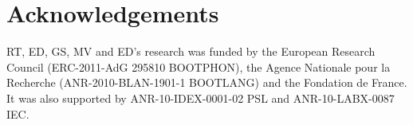 \documentclass[a4paper]{article}
\begin{document}
%



 \section{Acknowledgements}
RT, ED, GS, MV and ED's research was funded by the European Research Council (ERC-2011-AdG 295810 BOOTPHON), the Agence Nationale pour la Recherche (ANR-2010-BLAN-1901-1 BOOTLANG) and the Fondation de France. It was also supported by ANR-10-IDEX-0001-02 PSL and ANR-10-LABX-0087 IEC.
\end{document}
